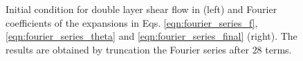 \documentclass[11pt]{article}
\begin{document}
\begin{figure}
\begin{minipage}{0.45\linewidth}
\begin{center}
        \end{center}
    \end{minipage}
    \caption{Initial condition for double layer shear flow in \cite{Bell1989} (left) and Fourier coefficients of the expansions in Eqs. \eqref{eqn:fourier_series_f}, \eqref{eqn:fourier_series_theta} and \eqref{eqn:fourier_series_final} (right). The results are obtained by truncation the Fourier series after $28$ terms.}
    \label{fig:shear_flow_initial_condition}
\end{figure}


\end{document}
